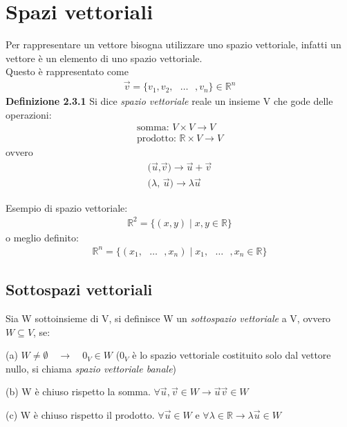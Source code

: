 \documentclass{article}
\begin{document}
\pagebreak
\section{Spazi vettoriali}
Per rappresentare un vettore bisogna utilizzare uno spazio vettoriale, infatti un vettore è un elemento di uno spazio vettoriale.
\\Questo è rappresentato come
\begin{align*}
  \vec{v}=\{v_1,v_2,\text{ }\dots\text{ },v_n\} \in \mathbb{R}^n
\end{align*}
\textbf{Definizione 2.3.1} Si dice \textit{spazio vettoriale} reale un insieme V che gode delle operazioni:
\begin{align*}
  \text{somma: } V \times V \to V \\
  \text{prodotto: } \mathbb{R} \times V \to V
\end{align*}
ovvero
\begin{align*}
  \text{($\vec{u}$,$\vec{v}$)} \to \vec{u}+\vec{v} \\
  \text{($\lambda$, $\vec{u}$)} \to \lambda \vec{u}
\end{align*}

Esempio di spazio vettoriale:
\begin{align*}
  \mathbb{R}^2 = \{(x,y) \mid x,y \in \mathbb{R}\}
\end{align*}
o meglio definito:
\begin{align*}
  \mathbb{R}^n = \{(x_1,\text{ }\dots \text{ }, x_n) \mid x_1,\text{ } \dots \text{ },x_n \in \mathbb{R}\}
\end{align*}
\subsection{Sottospazi vettoriali}
Sia W sottoinsieme di V, si definisce W un \textit{sottospazio vettoriale} a V, ovvero $W \subseteq V$, se:
\vspace{5px}\par (a) $W\neq \emptyset \quad \to \quad 0_V \in W$ ($0_V$ è lo spazio vettoriale costituito solo dal vettore nullo, si chiama \textit{spazio vettoriale banale})
\vspace{3px}\par (b) W è chiuso rispetto la somma. $\forall \vec{u},\vec{v} \in W \to \vec{u} \vec{v} \in W$
\vspace{3px}\par (c) W è chiuso rispetto il prodotto. $\forall \vec{u} \in W \text{ e } \forall \lambda \in \mathbb{R} \to \lambda \vec{u} \in W$
\end{document}

